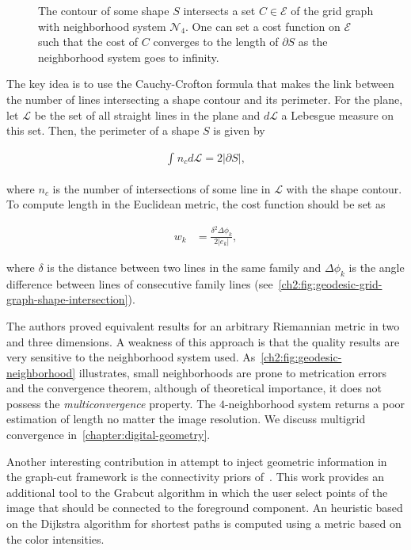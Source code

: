 \begin{figure}
\subfloat[\label{ch2:fig:geodesic-grid-graph-shape-intersection}]{
}
\subfloat[\label{ch2:fig:geodesic-neighborhood}]{
}
\caption{The contour of some shape $S$ intersects a set $C \in \mathcal{E}$ of the grid graph with neighborhood system $\mathcal{N}_4$. One can set a cost function on $\mathcal{E}$ such that the cost of $C$ converges to the length of $\partial S$ as the neighborhood system goes to infinity.}
\end{figure}

The key idea is to use the Cauchy-Crofton formula that makes the link between the number of lines intersecting a shape contour and its perimeter. For the plane, let $\mathcal{L}$ be the set of all straight lines in the plane and $d\mathcal{L}$ a Lebesgue measure on this set. Then, the perimeter of a shape $S$ is given by

\begin{align*}
\int_{}{n_c}d{\mathcal{L}} = 2|\partial S|,
\end{align*}

where $n_c$ is the number of intersections of some line in $\mathcal{L}$ with the shape contour. To compute length in the Euclidean metric, the cost function should be set as

\begin{align*}
	w_k &= \frac{ \delta^2 \Delta \phi_k }{2 |e_k|},
\end{align*}

where $\delta$ is the distance between two lines in the same family and $\Delta \phi_k$ is the angle difference between lines of consecutive family lines (see~\cref{ch2:fig:geodesic-grid-graph-shape-intersection}).

The authors proved equivalent results for an arbitrary Riemannian metric in two and three dimensions. A weakness of this approach is that the quality results are very sensitive to the neighborhood system used. As~\cref{ch2:fig:geodesic-neighborhood} illustrates, small neighborhoods are prone to metrication errors and the convergence theorem, although of theoretical importance, it does not possess the \emph{multiconvergence} property. The $4$-neighborhood system returns a poor estimation of length no matter the image resolution. We discuss multigrid convergence in~\cref{chapter:digital-geometry}.

Another interesting contribution in attempt to inject geometric information in the graph-cut framework is the connectivity priors of~\cite{vicente08graph}. This work provides an additional tool to the Grabcut algorithm in which the user select points of the image that should be connected to the foreground component. An heuristic based on the Dijkstra algorithm for shortest paths is computed using a metric based on the color intensities.


